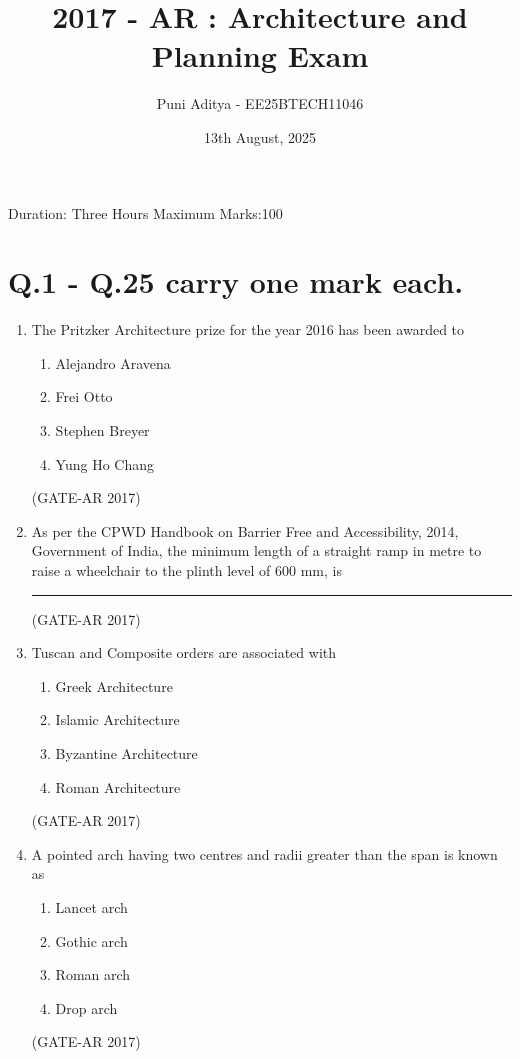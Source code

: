 \documentclass[a4paper,10pt]{article}
\begin{document}
\title{2017 - AR : Architecture and Planning Exam}
\author{Puni Aditya - EE25BTECH11046}
\date{13th August, 2025}
\maketitle
Duration: Three Hours \hfill Maximum Marks:100

\section*{Q.1 - Q.25 carry one mark each.}

\begin{enumerate}
    \item The Pritzker Architecture prize for the year 2016 has been awarded to 
    \begin{multicols}{2}
	\begin{enumerate}
        \item Alejandro Aravena
        \item Frei Otto
        \item Stephen Breyer
        \item Yung Ho Chang
    \end{enumerate}
	\end{multicols}
    \hfill (GATE-AR 2017)
    
    \item As per the CPWD Handbook on Barrier Free and Accessibility, 2014, Government of India, the minimum length of a straight ramp in metre to raise a wheelchair to the plinth level of 600 mm, is \rule{2cm}{0.4pt}
    \hfill (GATE-AR 2017)
    
    \item Tuscan and Composite orders are associated with 
    \begin{multicols}{2}
	\begin{enumerate}
        \item Greek Architecture
        \item Islamic Architecture
        \item Byzantine Architecture
        \item Roman Architecture
    \end{enumerate}
	\end{multicols}
    \hfill (GATE-AR 2017)
    
    \item A pointed arch having two centres and radii greater than the span is known as 
    \begin{multicols}{2}
	\begin{enumerate}
        \item Lancet arch
        \item Gothic arch
        \item Roman arch
        \item Drop arch
    \end{enumerate}
	\end{multicols}
    \hfill (GATE-AR 2017)


\end{enumerate}
\end{document}
